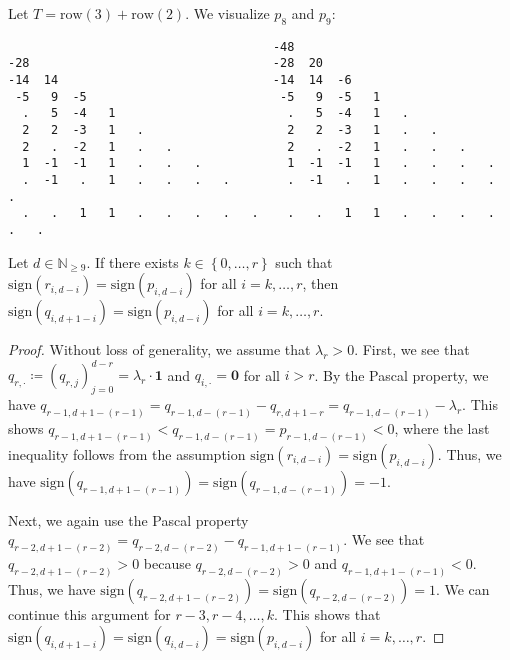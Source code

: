 \begin{example}
    Let \( T = \mathrm{row}(3) + \mathrm{row}(2) \). We visualize \( p_8 \) and \( p_9 \):
    \begin{verbatim}
                                     -48
-28                                  -28  20
-14  14                              -14  14  -6
 -5   9  -5                           -5   9  -5   1
  .   5  -4   1                        .   5  -4   1   . 
  2   2  -3   1   .                    2   2  -3   1   .   .
  2   .  -2   1   .   .                2   .  -2   1   .   .   .
  1  -1  -1   1   .   .   .            1  -1  -1   1   .   .   .   .
  .  -1   .   1   .   .   .   .        .  -1   .   1   .   .   .   .   .
  .   .   1   1   .   .   .   .   .    .   .   1   1   .   .   .   .   .   .
    \end{verbatim}
  \end{example}
  
\begin{lemma}\label{lemma:sign_row_propagation}
    Let \( d \in \mathbb{N}_{\geq 9} \). If there exists \( k \in \left\{ 0, \dots, r \right\} \) such that $\mathrm{sign}(r_{i,d-i}) = \mathrm{sign}(p_{i,d-i})$ for all \( i = k, \dots, r \), then \( \mathrm{sign}(q_{i,d+1-i}) = \mathrm{sign}(p_{i,d-i}) \) for all \( i = k, \dots, r\).
\end{lemma}

\begin{proof}
    Without loss of generality, we assume that \( \lambda_r > 0 \).
    First, we see that \( q_{r, \cdot} \coloneqq (q_{r,j})_{j=0}^{d-r} = \lambda_r \cdot \mathbf{1} \) and \( q_{i,\cdot} =  \mathbf{0} \) for all \( i > r \). By the Pascal property, we have \( q_{r-1,d+1-(r-1)} = q_{r-1,d-(r-1)} - q_{r,d+1-r} = q_{r-1,d-(r-1)} - \lambda_r \).
    This shows \( q_{r-1,d+1-(r-1)} < q_{r-1,d-(r-1)} = p_{r-1,d-(r-1)} < 0 \), where the last inequality follows from the assumption $\mathrm{sign}(r_{i,d-i}) = \mathrm{sign}(p_{i,d-i})$. Thus, we have \( \mathrm{sign}(q_{r-1,d+1-(r-1)}) = \mathrm{sign}(q_{r-1,d-(r-1)}) = \mathbf -1\). 
    
    Next, we again use the Pascal property \( q_{r-2,d+1-(r-2)} = q_{r-2,d-(r-2)} - q_{r-1,d+1-(r-1)} \). We see that \( q_{r-2,d+1-(r-2)} > 0 \) because \( q_{r-2,d-(r-2)} > 0 \) and \( q_{r-1,d+1-(r-1)} < 0 \). Thus, we have \( \mathrm{sign}(q_{r-2,d+1-(r-2)}) = \mathrm{sign}(q_{r-2,d-(r-2)}) = 1 \). We can continue this argument for \( r-3, r-4, \dots, k \). This shows that \( \mathrm{sign}(q_{i,d+1-i}) = \mathrm{sign}(q_{i,d-i}) = \mathrm{sign}(p_{i,d-i}) \) for all \( i = k, \dots, r\).
\end{proof}

